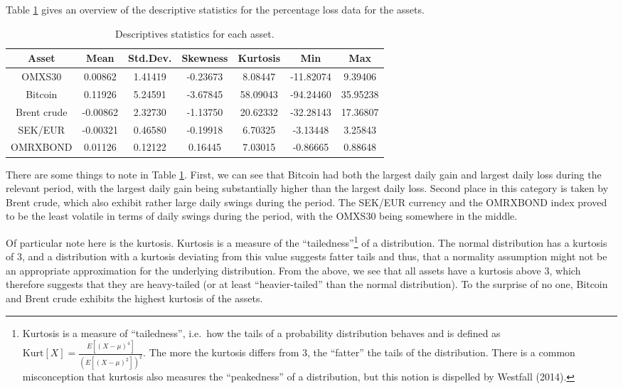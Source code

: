 \documentclass[a4paper,11pt]{article}
\theoremstyle{definition}
\theoremstyle{definition}
\theoremstyle{definition}
\theoremstyle{definition}
\theoremstyle{remark}
\begin{document}
Table \ref{tab:table1} gives an overview of the descriptive statistics for the percentage loss data for the assets.
\begin{table}[H]

\caption{\label{tab:table1}Descriptives statistics for each asset.}
\centering
\begin{tabular}[t]{ccccccc}
\toprule
\textbf{Asset} & \textbf{Mean} & \textbf{Std.Dev.} & \textbf{Skewness} & \textbf{Kurtosis} & \textbf{Min} & \textbf{Max}\\
\midrule
OMXS30 & 0.00862 & 1.41419 & -0.23673 & 8.08447 & -11.82074 & 9.39406\\
Bitcoin & 0.11926 & 5.24591 & -3.67845 & 58.09043 & -94.24460 & 35.95238\\
Brent crude & -0.00862 & 2.32730 & -1.13750 & 20.62332 & -32.28143 & 17.36807\\
SEK/EUR & -0.00321 & 0.46580 & -0.19918 & 6.70325 & -3.13448 & 3.25843\\
OMRXBOND & 0.01126 & 0.12122 & 0.16445 & 7.03015 & -0.86665 & 0.88648\\
\bottomrule
\end{tabular}
\end{table}
There are some things to note in Table \ref{tab:table1}. First, we can see that Bitcoin had both the largest daily gain and largest daily loss during the relevant period, with the largest daily gain being substantially higher than the largest daily loss. Second place in this category is taken by Brent crude, which also exhibit rather large daily swings during the period. The SEK/EUR currency and the OMRXBOND index proved to be the least volatile in terms of daily swings during the period, with the OMXS30 being somewhere in the middle.

Of particular note here is the kurtosis. Kurtosis is a measure of the ``tailedness''\footnote{Kurtosis is a measure of ``tailedness'', i.e.~how the tails of a probability distribution behaves and is defined as \(\text{Kurt}[X] = \frac{E[(X-\mu)^4]}{(E[(X-\mu)^2])^2}\). The more the kurtosis differs from 3, the ``fatter'' the tails of the distribution. There is a common misconception that kurtosis also measures the ``peakedness'' of a distribution, but this notion is dispelled by Westfall (2014).} of a distribution. The normal distribution has a kurtosis of 3, and a distribution with a kurtosis deviating from this value suggests fatter tails and thus, that a normality assumption might not be an appropriate approximation for the underlying distribution. From the above, we see that all assets have a kurtosis above 3, which therefore suggests that they are heavy-tailed (or at least ``heavier-tailed'' than the normal distribution). To the surprise of no one, Bitcoin and Brent crude exhibits the highest kurtosis of the assets.
\end{document}
